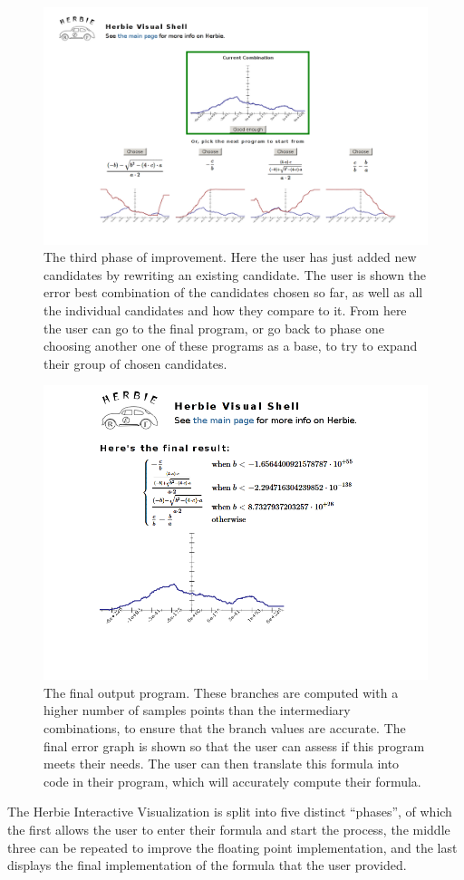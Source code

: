 \documentclass{chi2009}
\begin{document}
\begin{figure}
  \centering
  \includegraphics[width=.5\textwidth]{../../images/select_next_screen.png}
  \caption{The third phase of improvement. Here the user has just
    added new candidates by rewriting an existing candidate. The user
    is shown the error best combination of the candidates chosen so
    far, as well as all the individual candidates and how they compare
    to it. From here the user can go to the final program, or go back
    to phase one choosing another one of these programs as a base, to
    try to expand their group of chosen candidates.}
  \label{fig:select-next}
\end{figure}

\begin{figure}
  \centering
  \includegraphics[width=.5\textwidth]{../../images/final_combo_screen.png}
  \caption{The final output program. These branches are computed
    with a higher number of samples points than the intermediary
    combinations, to ensure that the branch values are accurate. The
    final error graph is shown so that the user can assess if this
    program meets their needs. The user can then translate this
    formula into code in their program, which will accurately
    compute their formula.}
  \label{fig:final-combo}
\end{figure}

The Herbie Interactive Visualization is split into five distinct
``phases'', of which the first allows the user to enter their formula
and start the process, the middle three can be repeated to improve the
floating point implementation, and the last displays the final
implementation of the formula that the user provided.
\end{document}
